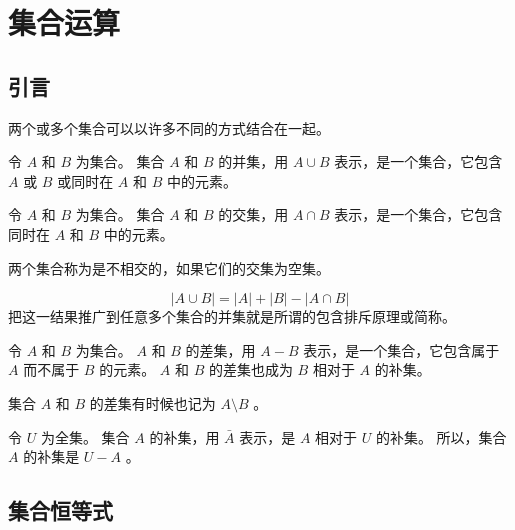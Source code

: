 
\section{集合运算}
{
    \subsection{引言}
    {
        两个或多个集合可以以许多不同的方式结合在一起。

        \begin{defines}
            令 $A$ 和 $B$ 为集合。
            集合 $A$ 和 $B$ 的并集，用 $A \cup B$ 表示，是一个集合，它包含 $A$ 或 $B$ 或同时在 $A$ 和 $B$ 中的元素。
        \end{defines}

        \begin{defines}
            令 $A$ 和 $B$ 为集合。
            集合 $A$ 和 $B$ 的交集，用 $A \cap B$ 表示，是一个集合，它包含同时在 $A$ 和 $B$ 中的元素。
        \end{defines}

        \begin{defines}
            两个集合称为是不相交的，如果它们的交集为空集。
        \end{defines}

        $$|A \cup B| = |A| + |B| - |A \cap B|$$
        把这一结果推广到任意多个集合的并集就是所谓的包含排斥原理或简称。

        \begin{defines}
            令 $A$ 和 $B$ 为集合。
            $A$ 和 $B$ 的差集，用 $A - B$ 表示，是一个集合，它包含属于 $A$ 而不属于 $B$ 的元素。
            $A$ 和 $B$ 的差集也成为 $B$ 相对于 $A$ 的补集。
        \end{defines}

        \begin{defines}
            集合 $A$ 和 $B$ 的差集有时候也记为 $A \setminus B$ 。
        \end{defines}

        \begin{defines}
            令 $U$ 为全集。
            集合 $A$ 的补集，用 $\bar{A}$ 表示，是 $A$ 相对于 $U$ 的补集。
            所以，集合 $A$ 的补集是 $U - A$ 。
        \end{defines}
    }

    \subsection{集合恒等式}
    {
        \begin{table}[htb]
            \centering


\end{table}}}
